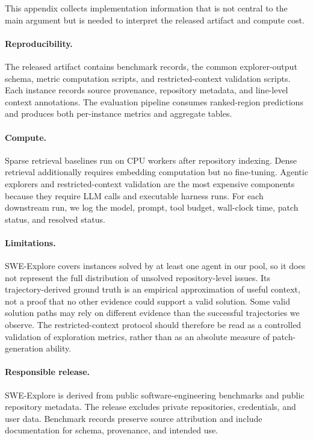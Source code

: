 \documentclass{llmxive}
\begin{document}
This appendix collects implementation information that is not central to the
main argument but is needed to interpret the released artifact and compute cost.

\paragraph{Reproducibility.}
The released artifact contains benchmark records, the common explorer-output
schema, metric computation scripts, and restricted-context validation scripts.
Each instance records source provenance, repository metadata, and line-level
context annotations. The evaluation pipeline consumes ranked-region predictions
and produces both per-instance metrics and aggregate tables.

\paragraph{Compute.}
Sparse retrieval baselines run on CPU workers after repository indexing. Dense
retrieval additionally requires embedding computation but no fine-tuning.
Agentic explorers and restricted-context validation are the most expensive
components because they require LLM calls and executable harness runs. For each
downstream run, we log the model, prompt, tool budget, wall-clock time, patch
status, and resolved status.

\paragraph{Limitations.}
SWE-Explore covers instances solved by at least one agent in our pool, so it does
not represent the full distribution of unsolved repository-level issues. Its
trajectory-derived ground truth is an empirical approximation of useful context,
not a proof that no other evidence could support a valid solution. Some valid
solution paths may rely on different evidence than the successful trajectories we
observe. The restricted-context protocol should therefore be read as a controlled
validation of exploration metrics, rather than as an absolute measure of
patch-generation ability.

\paragraph{Responsible release.}
SWE-Explore is derived from public software-engineering benchmarks and public
repository metadata. The release excludes private repositories, credentials, and
user data. Benchmark records preserve source attribution and include
documentation for schema, provenance, and intended use.
\end{document}
